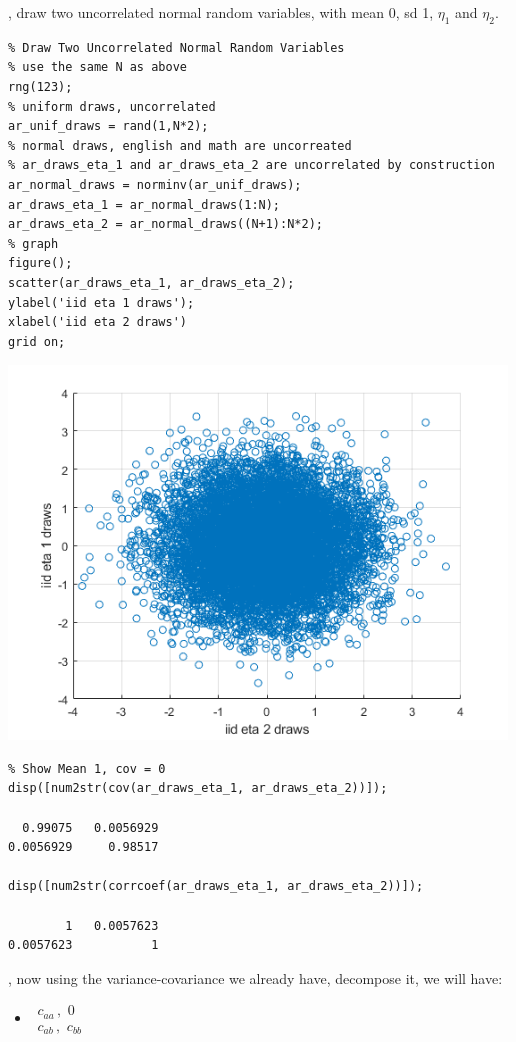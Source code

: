 \documentclass[
]{book}
\providecommand{\tightlist}{%
  \setlength{\itemsep}{0pt}\setlength{\parskip}{0pt}}
\begin{document}
, draw two uncorrelated normal random variables, with mean 0, sd 1,
\(\eta_1\) and \(\eta_2\).

\begin{verbatim}
% Draw Two Uncorrelated Normal Random Variables
% use the same N as above
rng(123);
% uniform draws, uncorrelated
ar_unif_draws = rand(1,N*2);
% normal draws, english and math are uncorreated
% ar_draws_eta_1 and ar_draws_eta_2 are uncorrelated by construction
ar_normal_draws = norminv(ar_unif_draws);
ar_draws_eta_1 = ar_normal_draws(1:N);
ar_draws_eta_2 = ar_normal_draws((N+1):N*2);
% graph
figure();
scatter(ar_draws_eta_1, ar_draws_eta_2);
ylabel('iid eta 1 draws');
xlabel('iid eta 2 draws')
grid on;
\end{verbatim}

\includegraphics[width=5.20833in,height=\textheight]{img/fs_cholesky_decomposition_images/figure_1.png}

\begin{verbatim}
% Show Mean 1, cov = 0
disp([num2str(cov(ar_draws_eta_1, ar_draws_eta_2))]);

  0.99075   0.0056929
0.0056929     0.98517

disp([num2str(corrcoef(ar_draws_eta_1, ar_draws_eta_2))]);

        1   0.0057623
0.0057623           1
\end{verbatim}

, now using the variance-covariance we already have, decompose it, we
will have:

\begin{itemize}
\tightlist
\item
  \(\displaystyle \begin{array}{l} c_{aa} \,,\,\,0\\ c_{ab} \,,\,\,c_{bb} \end{array}\)
\end{itemize}
\end{document}
